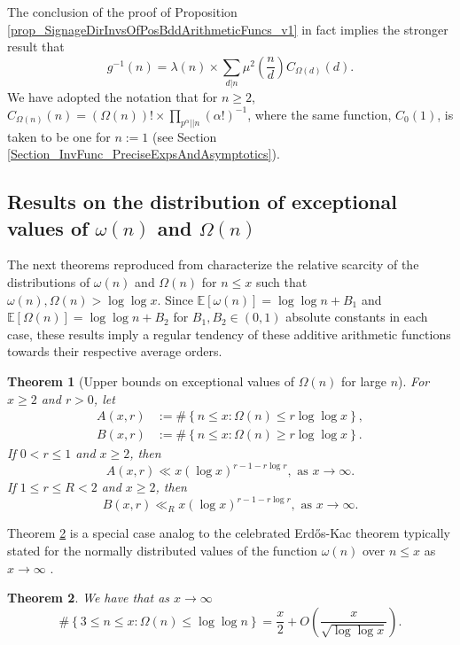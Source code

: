 \documentclass[11pt,reqno,a4letter]{article}
\numberwithin{figure}{section}
\numberwithin{table}{section}
\newcommand{\cf}{\textit{cf.\ }}
\theoremstyle{plain}
\newtheorem{theorem}{Theorem}
\numberwithin{theorem}{section}
\theoremstyle{definition}
\begin{document}
The conclusion of the proof of 
Proposition \ref{prop_SignageDirInvsOfPosBddArithmeticFuncs_v1} 
in fact implies the stronger result that 
\[
g^{-1}(n) = \lambda(n) \times \sum_{d|n} \mu^2\left(\frac{n}{d}\right) C_{\Omega(d)}(d).  
\]
We have adopted the notation that for $n \geq 2$, 
$C_{\Omega(n)}(n) = (\Omega(n))! \times \prod_{p^{\alpha} || n} (\alpha!)^{-1}$, 
where the same function, $C_0(1)$, is taken to be one for $n := 1$ 
(see Section \ref{Section_InvFunc_PreciseExpsAndAsymptotics}). 

\subsection{Results on the distribution of exceptional values of $\omega(n)$ and $\Omega(n)$} 

The next theorems reproduced from \cite[\S 7.4]{MV} characterize the relative 
scarcity of the distributions of $\omega(n)$ and $\Omega(n)$ for $n \leq x$ such that 
$\omega(n),\Omega(n) > \log\log x$. 
Since $\mathbb{E}[\omega(n)] = \log\log n + B_1$ and 
$\mathbb{E}[\Omega(n)] = \log\log n + B_2$ for $B_1,B_2 \in (0, 1)$ 
absolute constants in each case, 
these results imply a regular tendency 
of these additive arithmetic functions towards their respective average orders. 

\begin{theorem}[Upper bounds on exceptional values of $\Omega(n)$ for large $n$] 
\label{theorem_MV_Thm7.20-init_stmt} 
For $x \geq 2$ and $r > 0$, let 
\begin{align*} 
A(x, r) & := \#\left\{n \leq x: \Omega(n) \leq r \log\log x\right\}, \\ 
B(x, r) & := \#\left\{n \leq x: \Omega(n) \geq r \log\log x\right\}. 
\end{align*} 
If $0 < r \leq 1$ and $x \geq 2$, then 
\[
A(x, r) \ll x (\log x)^{r-1 - r\log r}, \text{ \ as\ } x \rightarrow \infty. 
\]
If $1 \leq r \leq R < 2$ and $x \geq 2$, then 
\[
B(x, r) \ll_R x (\log x)^{r-1-r \log r}, \text{ \ as\ } x \rightarrow \infty. 
\]
\end{theorem} 

Theorem \ref{theorem_MV_Thm7.21-init_stmt} is a special case analog to the 
celebrated Erd\H{o}s-Kac theorem typically stated for the 
normally distributed values of the function $\omega(n)$ over $n \leq x$ as 
$x \rightarrow \infty$ \cite[\cf Thm.\ 7.21]{MV} \cite[\cf \S 1.7]{IWANIEC-KOWALSKI}. 

\begin{theorem}
\label{theorem_MV_Thm7.21-init_stmt} 
We have that as $x \rightarrow \infty$ 
\[
\#\left\{3 \leq n \leq x: \Omega(n) \leq \log\log n \right\} = 
     \frac{x}{2} + O\left(\frac{x}{\sqrt{\log\log x}}\right). 
\]
\end{theorem} 
\end{document}
